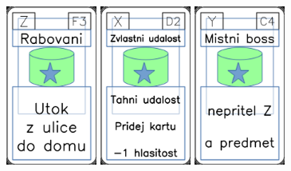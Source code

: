 \documentclass[a4paper]{article}
\begin{document}
	\includegraphics[width=3.0cm]{img-5_57}
	\includegraphics[width=3.0cm]{img-5_16}
	\includegraphics[width=3.0cm]{img-5_43}
\end{document}
